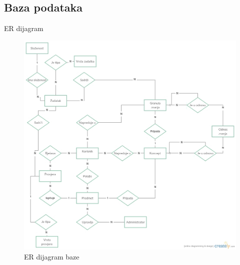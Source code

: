 \documentclass[times, utf8, numeric]{beamer}
\begin{document}
\subsection{Baza podataka}

\begin{frame}{ER dijagram}
\begin{figure}[er]
	\centering
	\includegraphics[width=\textwidth,height=0.7\textheight,keepaspectratio]{img/ER.jpg}
	\caption{ER dijagram baze}
	\label{fig:ER}
\end{figure}
\end{frame}
\end{document}
